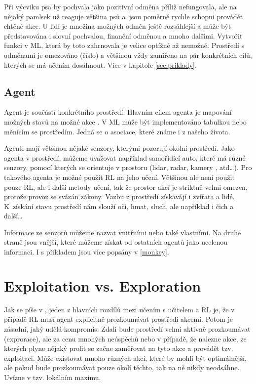 \documentclass{article}
\begin{document}
Při výcviku psa by pochvala jako pozitivní odměna příliž nefungovala, ale na nějaký pamlsek už reaguje většina psů a~jsou poměrně rychle schopni provádět chtěné akce. U lidí je množina možných odměn ještě rozsáhlejší a může být představována i slovní pochvalou, finanční odměnou a mnoho dalšími. Vytvořit funkci v ML, která by toto zahrnovala je velice optížné až nemožné. Prostředí s odměnami je omezováno (číslo) a většinou vždy zamířeno na pár konkrétních cílů, kterých se má učením dosáhnout. Více v kapitole \ref{sec:priklady}.


\subsection{Agent}
\label{agent}
Agent je součástí konkrétního prostředí. Hlavním cílem agenta je mapování možných stavů na možné akce \cite{sutton1999reinforcement}. V ML může být implementováno tabulkou nebo měnícím se prostředím. Jedná se o asociace, které známe i z našeho života. 

Agenti mají většinou nějaké senzory, kterými pozorují okolní prostředí. Jako agenta v prostředí, můžeme uvažovat například samořídící auto, které má různé senzory, pomocí kterých se orientuje v prostoru (lidar, radar, kamery , atd\dots). Pro takového agenta je možné použít RL na jeho učení. Většinou ale není použit pouze RL, ale i další metody učení, tak že prostor akcí je striktně velmi omezen, protože provoz se svázán zákony. Vazbu z  prostředí získavájí i zvířata a lidé. K~získání stavu prostředí nám slouží oči, hmat, sluch, ale například i čich a další\dots 

Informace ze senzorů můžeme nazvat vnitřními nebo také vlastními. Na druhé straně jsou vnější, které můžeme získat od ostatních agentů jako ucelenou informaci. I s příkladem jsou více popsány v \ref{monkey}.


\section{Exploitation vs. Exploration}
Jak se píše v \cite{kaelbling1996reinforcement}, jeden z hlavních rozdílů mezi učením s učitelem a RL je, že v případě RL musí agent explicitně prozkoumávat prostředí akcemi. Potom je zásadní, jaký udělá kompromis. Zdali bude prostředí velmi aktivně prozkoumávat (exprorace), ale za cenu mnohých neúspěchů nebo v případě, že nalezne akce, ze kterých plyne nějaký profit se začne zaměřovat na tyto akce a provádět tzv. exploitaci. Může existovat mnoho různých akcí, které by mohli být optimálnější, ale pokud bude prozkoumávat pouze okolí těchto, tak na ně nikdy neodsáhne. Uvízne v tzv. lokálním maximu.
\end{document}
